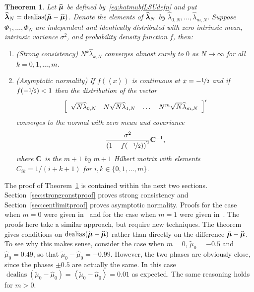 \documentclass[aap,preprint]{imsart}
\newcommand{\dealias}{\operatorname{dealias}}
\newcommand{\fracpart}[1]{\left\langle #1 \right\rangle}
\newtheorem{theorem}{Theorem}
\begin{document}
 
\begin{theorem} \label{thm:asymp_proof} 
Let $\widehat{\boldsymbol{\mu}}$ be defined by~\eqref{eq:hatmubfLSUdefn} and put $\widehat{\lambdabf}_N = \dealias(\tilde{\mubf} - \widehat{\mubf})$.  Denote the elements of $\widehat{\boldsymbol{\lambda}}_N$ by $\widehat{\lambda}_{0,N}, \dots, \widehat{\lambda}_{m,N}$.  Suppose $\Phi_1, \dots, \Phi_N$ are independent and identically distributed with zero intrinsic mean, intrinsic variance $\sigma^2$, and probability density function $f$, then: 
\begin{enumerate}
\item (Strong consistency) $N^k \widehat{\lambda}_{k,N}$ converges almost surely to $0$ as $N\rightarrow\infty$ for all $k = 0, 1, \dots, m$.
\item (Asymptotic normality) If $f(\fracpart{x})$ is continuous at $x = -\nicefrac{1}{2}$ and if $f(-\nicefrac{1}{2}) < 1$ then the distribution of the vector
\[
\left[
\begin{array}
[c]{cccc}%
\sqrt{N} \widehat{\lambda}_{0,N} & N \sqrt{N}\widehat{\lambda}_{1,N}  & \dots & N^m\sqrt{N} \widehat{\lambda}_{m,N}
\end{array}
\right]^\prime
\]
converges to the normal with zero mean and covariance
\[
\frac{\sigma^2}{\left(1-f( -\nicefrac{1}{2}) \right)^{2}} \mathbf{C}^{-1},
\]
where $\mathbf{C}$ is the $m+1$ by $m+1$ Hilbert matrix with elements $C_{ik} = 1/(i + k + 1)$ for $i,k \in \{0, 1, \dots, m\}$.
\end{enumerate}
\end{theorem}
The proof of Theorem~\ref{thm:asymp_proof} is contained within the next two sections. Section~\ref{sec:strongconstproof} proves strong consistency and Section~\ref{sec:centlimitproof} proves asymptotic normality.  Proofs for the case when $m=0$ were given in~\cite{McKilliam_mean_dir_est_sq_arc_length2010} and for the case when $m=1$ were given in~\cite{McKilliamFrequencyEstimationByPhaseUnwrapping2009}.  The proofs here take a similar approach, but require new techniques.  %
The theorem gives conditions on $\dealias(\tilde{\mubf} - \widehat{\mubf})$ rather than directly on the difference $\tilde{\boldsymbol{\mu}} - \widehat{\boldsymbol{\mu}}$.   To see why this makes sense, consider the case when $m=0$, $\tilde{\mu}_0 = -0.5$ and $\widehat{\mu}_0 = 0.49$, so that $\tilde{\mu}_0 - \widehat{\mu}_0 = -0.99$.  However, the two phases are obviously close, since the phases $\pm 0.5$ are actually the same.  In this case $\dealias(\tilde{\mu}_0 - \widehat{\mu}_0) = \fracpart{\tilde{\mu}_0 - \widehat{\mu}_0} = 0.01$ as expected.  The same reasoning holds for $m > 0$.
\end{document}
